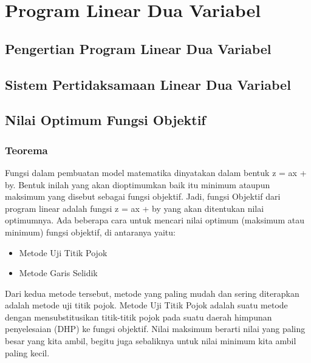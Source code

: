\documentclass[11pt,fleqn]{book} %
\begin{document}


\chapter{Program Linear Dua Variabel}

\section{Pengertian Program Linear Dua Variabel}

\section{Sistem Pertidaksamaan Linear Dua Variabel}

\section{Nilai Optimum Fungsi Objektif}
\subsection{Teorema}
Fungsi dalam pembuatan model matematika dinyatakan dalam bentuk z = ax + by. Bentuk inilah yang akan dioptimumkan baik itu minimum ataupun maksimum yang disebut sebagai fungsi objektif. Jadi, fungsi Objektif dari program linear adalah fungsi z = ax + by yang akan ditentukan nilai optimumnya.
Ada beberapa cara untuk mencari nilai optimum (maksimum atau minimum) fungsi objektif, di antaranya yaitu:
\begin{itemize}
\item Metode Uji Titik Pojok
\item Metode Garis Selidik
\end{itemize}
Dari kedua metode tersebut, metode yang paling mudah dan sering diterapkan adalah metode uji titik pojok.
Metode Uji Titik Pojok adalah suatu metode dengan mensubstitusikan titik-titik pojok pada suatu daerah himpunan penyelesaian (DHP) ke fungsi objektif. Nilai maksimum berarti nilai yang paling besar yang kita ambil, begitu juga sebaliknya untuk nilai minimum kita ambil paling kecil.
\end{document}
